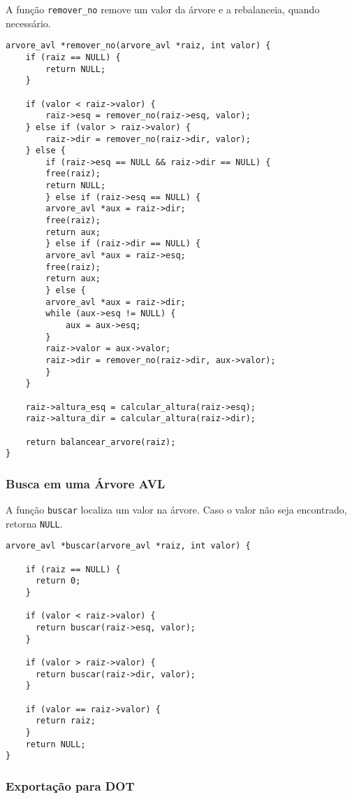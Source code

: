 A função \texttt{remover\_no} remove um valor da árvore e a rebalanceia, quando necessário.

\begin{verbatim}
arvore_avl *remover_no(arvore_avl *raiz, int valor) {
    if (raiz == NULL) {
        return NULL;
    }
      
    if (valor < raiz->valor) {
        raiz->esq = remover_no(raiz->esq, valor);
    } else if (valor > raiz->valor) {
        raiz->dir = remover_no(raiz->dir, valor);
    } else {
        if (raiz->esq == NULL && raiz->dir == NULL) {
        free(raiz);
        return NULL;
        } else if (raiz->esq == NULL) {
        arvore_avl *aux = raiz->dir;
        free(raiz);
        return aux;
        } else if (raiz->dir == NULL) {
        arvore_avl *aux = raiz->esq;
        free(raiz);
        return aux;
        } else {
        arvore_avl *aux = raiz->dir;
        while (aux->esq != NULL) {
            aux = aux->esq;
        }
        raiz->valor = aux->valor;
        raiz->dir = remover_no(raiz->dir, aux->valor);
        }
    }
      
    raiz->altura_esq = calcular_altura(raiz->esq);
    raiz->altura_dir = calcular_altura(raiz->dir);
  
    return balancear_arvore(raiz);
}
\end{verbatim}

\subsubsection{Busca em uma Árvore AVL}

A função \texttt{buscar} localiza um valor na árvore. Caso o valor não seja encontrado, retorna \texttt{NULL}.

\begin{verbatim}
arvore_avl *buscar(arvore_avl *raiz, int valor) {

    if (raiz == NULL) {
      return 0;
    }
  
    if (valor < raiz->valor) {
      return buscar(raiz->esq, valor);
    }
  
    if (valor > raiz->valor) {
      return buscar(raiz->dir, valor);
    }
  
    if (valor == raiz->valor) {
      return raiz;
    }
    return NULL;
}
\end{verbatim}

\subsubsection{Exportação para DOT}

